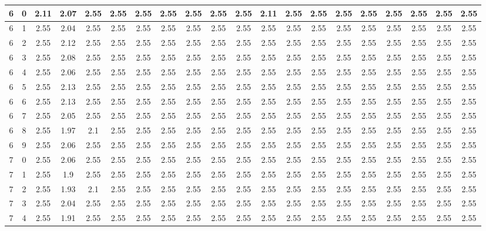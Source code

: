 \begin{landscape}
\begin{longtable}{|c|c||c||c|c|c|c|c|c|c|c||c|c|c|c|c|c|c|c|c|}
	6 & 0 & 2.11 & 2.07 & 2.55 & 2.55 & 2.55 & 2.55 & 2.55 & 2.55 & 2.55 & 2.11 & 2.55 & 2.55 & 2.55 & 2.55 & 2.55 & 2.55 & 2.55 & 2.55 \\ \hline
	6 & 1 & 2.55 & 2.04 & 2.55 & 2.55 & 2.55 & 2.55 & 2.55 & 2.55 & 2.55 & 2.55 & 2.55 & 2.55 & 2.55 & 2.55 & 2.55 & 2.55 & 2.55 & 2.55 \\ \hline
	6 & 2 & 2.55 & 2.12 & 2.55 & 2.55 & 2.55 & 2.55 & 2.55 & 2.55 & 2.55 & 2.55 & 2.55 & 2.55 & 2.55 & 2.55 & 2.55 & 2.55 & 2.55 & 2.55 \\ \hline
	6 & 3 & 2.55 & 2.08 & 2.55 & 2.55 & 2.55 & 2.55 & 2.55 & 2.55 & 2.55 & 2.55 & 2.55 & 2.55 & 2.55 & 2.55 & 2.55 & 2.55 & 2.55 & 2.55 \\ \hline
	6 & 4 & 2.55 & 2.06 & 2.55 & 2.55 & 2.55 & 2.55 & 2.55 & 2.55 & 2.55 & 2.55 & 2.55 & 2.55 & 2.55 & 2.55 & 2.55 & 2.55 & 2.55 & 2.55 \\ \hline
	6 & 5 & 2.55 & 2.13 & 2.55 & 2.55 & 2.55 & 2.55 & 2.55 & 2.55 & 2.55 & 2.55 & 2.55 & 2.55 & 2.55 & 2.55 & 2.55 & 2.55 & 2.55 & 2.55 \\ \hline
	6 & 6 & 2.55 & 2.13 & 2.55 & 2.55 & 2.55 & 2.55 & 2.55 & 2.55 & 2.55 & 2.55 & 2.55 & 2.55 & 2.55 & 2.55 & 2.55 & 2.55 & 2.55 & 2.55 \\ \hline
	6 & 7 & 2.55 & 2.05 & 2.55 & 2.55 & 2.55 & 2.55 & 2.55 & 2.55 & 2.55 & 2.55 & 2.55 & 2.55 & 2.55 & 2.55 & 2.55 & 2.55 & 2.55 & 2.55 \\ \hline
	6 & 8 & 2.55 & 1.97 & 2.1 & 2.55 & 2.55 & 2.55 & 2.55 & 2.55 & 2.55 & 2.55 & 2.55 & 2.55 & 2.55 & 2.55 & 2.55 & 2.55 & 2.55 & 2.55 \\ \hline
	6 & 9 & 2.55 & 2.06 & 2.55 & 2.55 & 2.55 & 2.55 & 2.55 & 2.55 & 2.55 & 2.55 & 2.55 & 2.55 & 2.55 & 2.55 & 2.55 & 2.55 & 2.55 & 2.55 \\ \hline
	7 & 0 & 2.55 & 2.06 & 2.55 & 2.55 & 2.55 & 2.55 & 2.55 & 2.55 & 2.55 & 2.55 & 2.55 & 2.55 & 2.55 & 2.55 & 2.55 & 2.55 & 2.55 & 2.55 \\ \hline
	7 & 1 & 2.55 & 1.9 & 2.55 & 2.55 & 2.55 & 2.55 & 2.55 & 2.55 & 2.55 & 2.55 & 2.55 & 2.55 & 2.55 & 2.55 & 2.55 & 2.55 & 2.55 & 2.55 \\ \hline
	7 & 2 & 2.55 & 1.93 & 2.1 & 2.55 & 2.55 & 2.55 & 2.55 & 2.55 & 2.55 & 2.55 & 2.55 & 2.55 & 2.55 & 2.55 & 2.55 & 2.55 & 2.55 & 2.55 \\ \hline
	7 & 3 & 2.55 & 2.04 & 2.55 & 2.55 & 2.55 & 2.55 & 2.55 & 2.55 & 2.55 & 2.55 & 2.55 & 2.55 & 2.55 & 2.55 & 2.55 & 2.55 & 2.55 & 2.55 \\ \hline
	7 & 4 & 2.55 & 1.91 & 2.55 & 2.55 & 2.55 & 2.55 & 2.55 & 2.55 & 2.55 & 2.55 & 2.55 & 2.55 & 2.55 & 2.55 & 2.55 & 2.55 & 2.55 & 2.55 \\ \hline

\end{longtable}
\end{landscape}
